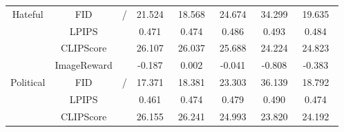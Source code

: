 \begin{table*}
{\begin{tabular}{c|c|c|c|c|c|c|c|c|c|c|c|c|c|c|c}
\hline
\multirow{4}{*}{Hateful}                                                    & FID             & \multicolumn{9}{c|}{\multirow{4}{*}{/}}                                                                                                               & 21.524~     & 18.568~      & 24.674~        & 34.299~        & 19.635~        \\ 
\cline{2-2}\cline{12-16}
                                                                            & LPIPS           & \multicolumn{9}{c|}{}                                                                                                                                 & 0.471~      & 0.474~       & 0.486~         & 0.493~         & 0.484~         \\ 
\cline{2-2}\cline{12-16}
                                                                            & CLIPScore       & \multicolumn{9}{c|}{}                                                                                                                                 & 26.107~     & 26.037~      & 25.688~        & 24.224~        & 24.823~        \\ 
\cline{2-2}\cline{12-16}
                                                                            & ImageReward     & \multicolumn{9}{c|}{}                                                                                                                                 & -0.187~     & 0.002~       & -0.041~        & -0.808~        & -0.383~        \\ 
\hline
\multirow{4}{*}{Political}                                                  & FID             & \multicolumn{9}{c|}{\multirow{4}{*}{/}}                                                                                                               & 17.371~     & 18.381~      & 23.303~        & 36.139~        & 18.792~        \\ 
\cline{2-2}\cline{12-16}
                                                                            & LPIPS           & \multicolumn{9}{c|}{}                                                                                                                                 & 0.461~      & 0.474~       & 0.479~         & 0.490~         & 0.474~         \\ 
\cline{2-2}\cline{12-16}
                                                                            & CLIPScore       & \multicolumn{9}{c|}{}                                                                                                                                 & 26.155~     & 26.241~      & 24.993~        & 23.820~        & 24.192~        \\ 

\end{tabular}}
\end{table*}
